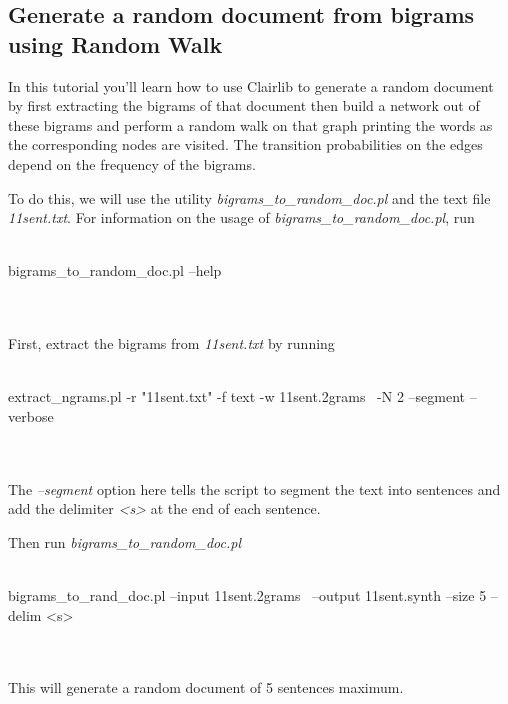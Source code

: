 \subsection{Generate a random document from bigrams using Random Walk}
In this tutorial you'll learn how to use Clairlib to generate a random document by first extracting the bigrams of that document then build a network out of these bigrams and perform a random walk on that graph printing the words as the corresponding nodes are visited. The transition probabilities on the edges depend on the frequency of the bigrams.

To do this, we will use the utility \emph{bigrams\_to\_random\_doc.pl} and the text file \emph{11sent.txt}. For information on the usage of \emph{bigrams\_to\_random\_doc.pl}, run
\\
\\
\begin{boxedverbatim}
 bigrams_to_random_doc.pl --help
\end{boxedverbatim}
\\
\\
First, extract the bigrams from \emph{11sent.txt} by running
\\
\\
\begin{boxedverbatim}
 extract_ngrams.pl -r "11sent.txt" -f text -w 11sent.2grams \
 -N 2 --segment --verbose
\end{boxedverbatim}
\\
\\
The \emph{--segment} option here tells the script to segment the text into sentences and add the delimiter \emph{<s>} at the end of each sentence.

Then run \emph{bigrams\_to\_random\_doc.pl}
\\
\\
\begin{boxedverbatim}
 bigrams_to_rand_doc.pl --input 11sent.2grams \
 --output 11sent.synth --size 5 --delim <s>
\end{boxedverbatim}
\\
\\
This will generate a random document of 5 sentences maximum. 
